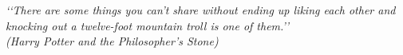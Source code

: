 \begin{epigrafe}
    \vspace*{\fill}
	\begin{flushright}
		\textit{\lq\lq There are some things you can't share without ending up liking each other and knocking out a twelve-foot mountain troll is one of them.\rq\rq{} \\(Harry Potter and the Philosopher's Stone)}
	\end{flushright}
\end{epigrafe}
